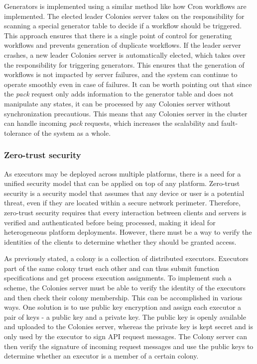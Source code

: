 \documentclass{article}
\begin{document}
Generators is implemented using a similar method like how Cron workflows are implemented. The elected leader Colonies server takes on the responsibility for scanning a special generator table to decide if a workflow should be triggered. This approach ensures that there is a single point of control for generating workflows and prevents generation of duplicate workflows. If the leader server crashes, a new leader Colonies server is automatically elected, which takes over the responsibility for triggering generators. This ensures that the generation of workflows is not impacted by server failures, and the system can continue to operate smoothly even in case of failures. It can be worth pointing out that since the \emph{pack} request only adds information to the generator table and does not manipulate any states, it can be processed by any Colonies server without synchronization precautious. This means that any Colonies server in the cluster can handle incoming \emph{pack} requests, which increases the scalability and fault-tolerance of the system as a whole.

\subsubsection{Zero-trust security}
\label{zerotrustsecurity}
As executors may be deployed across multiple platforms, there is a need for a unified security model that can be applied on top of any platform. Zero-trust security \cite{zerotrust} is a security model that assumes that any device or user is a potential threat, even if they are located within a secure network perimeter. Therefore, zero-trust security requires that every interaction between clients and servers is verified and authenticated before being processed, making it ideal for heterogeneous platform deployments. However, there must be a way to verify the identities of the clients to determine whether they should be granted access.

As previously stated, a colony is a collection of distributed executors. Executors part of the same colony trust each other and can thus submit function specifications and get process execution assignments. To implement such a scheme, the Colonies server must be able to verify the identity of the executors and then check their colony membership. This can be accomplished in various ways. One solution is to use public key encryption and assign each executor a pair of keys - a public key and a private key. The public key is openly available and uploaded to the Colonies server, whereas the private key is kept secret and is only used by the executor to sign API request messages. The Colony server can then verify the signature of incoming request messages and use the public keys to determine whether an executor is a member of a certain colony.
\end{document}
